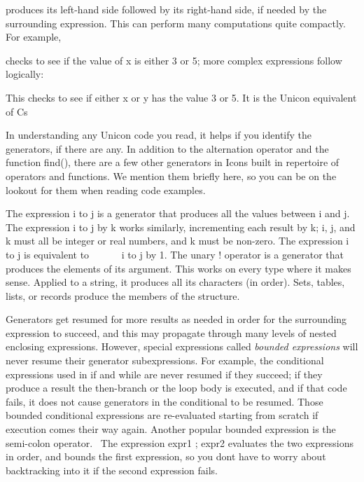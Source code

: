 
\noindent
produces its left-hand side followed by its right-hand side, if needed
by the surrounding expression. This can perform many computations quite
compactly. For example,


checks to see if the value of \textsf{x} is either 3 or 5; more complex
expressions follow logically:


This checks to see if either \textsf{x} or \textsf{y} has the value 3 or
5. It is the Unicon equivalent of C{\textquotesingle}s


In understanding any Unicon code you read, it helps if you identify the
generators, if there are any. In addition to the alternation operator
\textsf{{\textbar}} and the function \textsf{find()}, there are a few
other generators in Icon{\textquotesingle}s built in repertoire of
operators and functions. We mention them briefly here, so you can be on
the lookout for them when reading code examples.

The expression \textsf{i }\textsf{to j} is a
generator that produces all the values between \textsf{i} and
\textsf{j.} The expression \textsf{i to j }\textsf{by k} works similarly, incrementing each result by
\textsf{k}; \textsf{i}, \textsf{j}, and \textsf{k} must all be integer
or real numbers, and \textsf{k} must be non-zero. The expression
\textsf{i to j} is equivalent to \ \ \ \ \ \ \textsf{i to j by 1}. The
unary \textsf{!} operator is a generator
that produces the elements of its argument. This works on every type
where it makes sense. Applied to a string, it produces all its
characters (in order). Sets, tables, lists, or records produce the
members of the structure.

Generators get resumed for more results as needed in order for the
surrounding expression to succeed, and this may propagate through many
levels of nested enclosing expressions. However, special expressions
called \textit{bounded expressions} will
never resume their generator subexpressions. For example, the
conditional expressions used in \textsf{if} and \textsf{while} are
never resumed if they succeed; if they produce a result the then-branch
or the loop body is executed, and if that code fails, it does not cause
generators in the conditional to be resumed. Those bounded conditional
expressions are re-evaluated starting from scratch if execution comes
their way again. Another popular bounded expression is the semi-colon
operator. \ The expression \textsf{expr1 ; expr2 }evaluates the two
expressions in order, and bounds the first expression, so you
don{\textquotesingle}t have to worry about backtracking into it if the
second expression fails.

